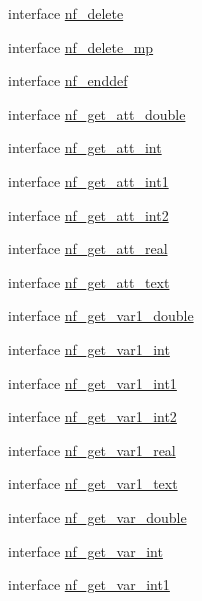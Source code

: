 \begin{DoxyCompactItemize}
interface \hyperlink{interfacenetcdf__nf__interfaces_1_1nf__delete}{nf\+\_\+delete}
\item 
interface \hyperlink{interfacenetcdf__nf__interfaces_1_1nf__delete__mp}{nf\+\_\+delete\+\_\+mp}
\item 
interface \hyperlink{interfacenetcdf__nf__interfaces_1_1nf__enddef}{nf\+\_\+enddef}
\item 
interface \hyperlink{interfacenetcdf__nf__interfaces_1_1nf__get__att__double}{nf\+\_\+get\+\_\+att\+\_\+double}
\item 
interface \hyperlink{interfacenetcdf__nf__interfaces_1_1nf__get__att__int}{nf\+\_\+get\+\_\+att\+\_\+int}
\item 
interface \hyperlink{interfacenetcdf__nf__interfaces_1_1nf__get__att__int1}{nf\+\_\+get\+\_\+att\+\_\+int1}
\item 
interface \hyperlink{interfacenetcdf__nf__interfaces_1_1nf__get__att__int2}{nf\+\_\+get\+\_\+att\+\_\+int2}
\item 
interface \hyperlink{interfacenetcdf__nf__interfaces_1_1nf__get__att__real}{nf\+\_\+get\+\_\+att\+\_\+real}
\item 
interface \hyperlink{interfacenetcdf__nf__interfaces_1_1nf__get__att__text}{nf\+\_\+get\+\_\+att\+\_\+text}
\item 
interface \hyperlink{interfacenetcdf__nf__interfaces_1_1nf__get__var1__double}{nf\+\_\+get\+\_\+var1\+\_\+double}
\item 
interface \hyperlink{interfacenetcdf__nf__interfaces_1_1nf__get__var1__int}{nf\+\_\+get\+\_\+var1\+\_\+int}
\item 
interface \hyperlink{interfacenetcdf__nf__interfaces_1_1nf__get__var1__int1}{nf\+\_\+get\+\_\+var1\+\_\+int1}
\item 
interface \hyperlink{interfacenetcdf__nf__interfaces_1_1nf__get__var1__int2}{nf\+\_\+get\+\_\+var1\+\_\+int2}
\item 
interface \hyperlink{interfacenetcdf__nf__interfaces_1_1nf__get__var1__real}{nf\+\_\+get\+\_\+var1\+\_\+real}
\item 
interface \hyperlink{interfacenetcdf__nf__interfaces_1_1nf__get__var1__text}{nf\+\_\+get\+\_\+var1\+\_\+text}
\item 
interface \hyperlink{interfacenetcdf__nf__interfaces_1_1nf__get__var__double}{nf\+\_\+get\+\_\+var\+\_\+double}
\item 
interface \hyperlink{interfacenetcdf__nf__interfaces_1_1nf__get__var__int}{nf\+\_\+get\+\_\+var\+\_\+int}
\item 
interface \hyperlink{interfacenetcdf__nf__interfaces_1_1nf__get__var__int1}{nf\+\_\+get\+\_\+var\+\_\+int1}

\end{DoxyCompactItemize}
